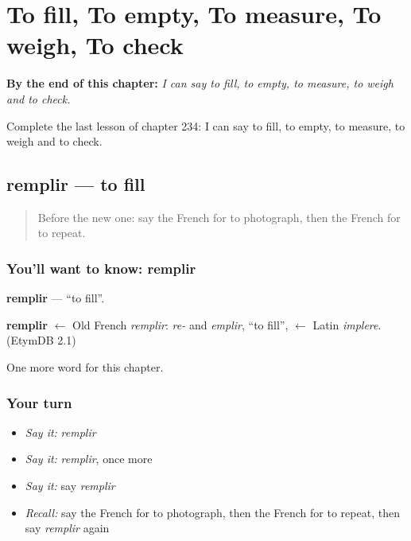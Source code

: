 
\chapter{To fill, To empty, To measure, To weigh, To check}
\label{ch:fr-to-fill-to-empty-to-measure-to-weigh-to-check}

\begin{chapteropening}
\textbf{By the end of this chapter:} \emph{I can say to fill, to empty, to measure, to weigh and to check.}

Complete the last lesson of chapter 234: I can say to fill, to empty, to measure, to weigh and to check.
\end{chapteropening}

\section[remplir]{remplir — to fill}

\label{lesson:FR-C234-remplir}



\begin{quote}
Before the new one: say the French for to photograph, then the French for to repeat.
\end{quote}

\subsection*{You'll want to know: remplir}
\textbf{remplir} — \textquotedblleft{}to fill\textquotedblright{}.

\begin{cousinweb}
\textbf{remplir} $\leftarrow$ Old French \emph{remplir}: \emph{re-} and \emph{emplir}, \textquotedblleft{}to fill\textquotedblright{}, $\leftarrow$ Latin \emph{implere}. (EtymDB 2.1)
\end{cousinweb}

\begin{grammarlens}[title={What you've built}]
One more word for this chapter.
\end{grammarlens}

\subsection*{Your turn}
\begin{itemize}
\raggedright
  \item \emph{Say it:} \emph{remplir}
  \item \emph{Say it:} \emph{remplir}, once more
  \item \emph{Say it:} say \emph{remplir}
  \item \emph{Recall:} say the French for to photograph, then the French for to repeat, then say \emph{remplir} again
\end{itemize}

